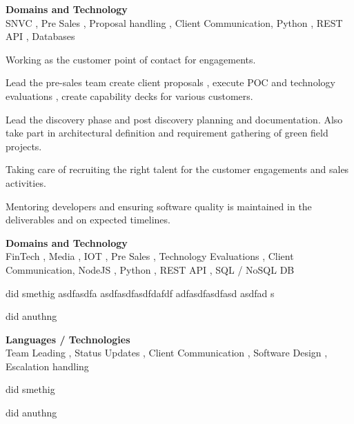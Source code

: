 \documentclass[a4,10pt]{cv4tw}
\begin{document}
    {\textbf{Domains and Technology } \\ SNVC , Pre Sales , Proposal handling , Client Communication, Python  , REST API , Databases }
    {
        \begin{missions}
        \item Working as the customer point of contact for engagements.
        \item Lead the pre-sales team create client proposals , execute POC and technology evaluations , create capability decks for various customers.
        \item Lead the discovery phase and post discovery planning and documentation. Also take part in architectural definition and requirement gathering of green field projects.
        \item Taking care of recruiting the right talent for the customer engagements and sales activities.
        \item Mentoring developers and ensuring software quality is maintained in the deliverables and on expected timelines.
        \end{missions}
        }

    {\textbf{Domains and Technology } \\ FinTech , Media , IOT , Pre Sales , Technology Evaluations , Client Communication, NodeJS , Python  , REST API , SQL / NoSQL DB}
    {
        \begin{missions}
        \item did smethig asdfasdfa asdfasdfasdfdafdf adfasdfasdfasd asdfad s
        \item did anuthng
        \end{missions}
    }

        {\textbf{Languages / Technologies} \\ Team Leading , Status Updates , Client Communication , Software Design , Escalation handling}
    {
        \begin{missions}
        \item did smethig
        \item did anuthng
        \end{missions}
    }
\end{document}

